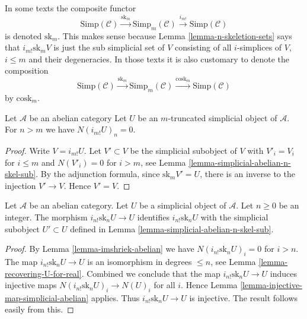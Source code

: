 \begin{remark}
\label{remark-sk-literature}
In some texts the composite functor
$$
\text{Simp}(\mathcal{C})
\xrightarrow{\text{sk}_m}
\text{Simp}_m(\mathcal{C})
\xrightarrow{i_{m!}}
\text{Simp}(\mathcal{C})
$$
is denoted $\text{sk}_m$. This makes sense because
Lemma \ref{lemma-n-skeletion-sets} says
that $i_{m!} \text{sk}_m V$ is just the sub simplicial set
of $V$ consisting of all $i$-simplices of $V$, $i \leq m$
and their degeneracies. In those texts it is also customary
to denote the composition
$$
\text{Simp}(\mathcal{C})
\xrightarrow{\text{sk}_m}
\text{Simp}_m(\mathcal{C})
\xrightarrow{\text{cosk}_m}
\text{Simp}(\mathcal{C})
$$
by $\text{cosk}_m$.
\end{remark}

\begin{lemma}
\label{lemma-imshriek-abelian}
Let $\mathcal{A}$ be an abelian category
Let $U$ be an $m$-truncated simplicial object of
$\mathcal{A}$. For $n > m$ we have $N(i_{m!}U)_n = 0$.
\end{lemma}

\begin{proof}
Write $V = i_{m!}U$. Let $V' \subset V$ be the
simplicial subobject of $V$ with $V'_i = V_i$ for $i \leq m$
and $N(V'_i) = 0$ for $i > m$,
see Lemma \ref{lemma-simplicial-abelian-n-skel-sub}.
By the adjunction formula,
since $\text{sk}_m V' = U$, there is an inverse to the
injection $V' \to V$. Hence $V' = V$.
\end{proof}

\begin{lemma}
\label{lemma-n-skeletion-abelian}
Let $\mathcal{A}$ be an abelian category.
Let $U$ be a simplicial object of $\mathcal{A}$.
Let $n \geq 0$ be an integer.
The morphism $i_{n!} \text{sk}_n U \to U$ identifies
$i_{n!} \text{sk}_n U$ with the simplicial subobject
$U' \subset U$ defined in Lemma \ref{lemma-simplicial-abelian-n-skel-sub}.
\end{lemma}

\begin{proof}
By Lemma \ref{lemma-imshriek-abelian} 
we have $N(i_{n!} \text{sk}_n U)_i = 0$
for $i > n$. The map
$i_{n!} \text{sk}_n U \to U$ is an isomorphism
in degrees $\leq n$, see Lemma \ref{lemma-recovering-U-for-real}.
Combined we conclude that the map $i_{n!} \text{sk}_n U \to U$
induces injective maps $N(i_{n!} \text{sk}_n U)_i \to N(U)_i$
for all $i$. Hence Lemma \ref{lemma-injective-map-simplicial-abelian}
applies. Thus $i_{n!} \text{sk}_n U \to U$
is injective. The result follows easily from this.
\end{proof}







